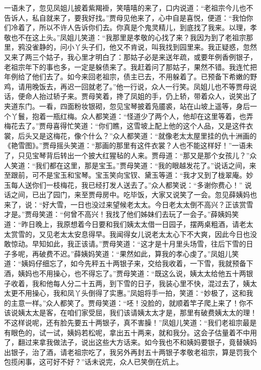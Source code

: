 \documentclass[12pt,oneside]{book}
\begin{document}
一语未了，忽见凤姐儿披着紫羯褂，笑嘻嘻的来了，口内说道：“老祖宗今儿也不告诉人，私自就来了，要我好找。”贾母见他来了，心中自是喜悦，便道：“我怕你们冷着了，所以不许人告诉你们去。你真是个鬼灵精儿，到底找了我来。以理，孝敬也不在这上头。”凤姐儿笑道：“我那里是孝敬的心找了来？我因为到了老祖宗那里，鸦没雀静的，问小丫头子们，他又不肯说，叫我找到园里来。我正疑惑，忽然又来了两三个姑子，我心里才明白了：那姑子必是来送年疏，或要年例香例银子，老祖宗年下的事也多，一定是躲债来了。我赶着问了那姑子，果然不错。我连忙把年例给了他们去了。如今来回老祖宗，债主已去，不用躲着了。已预备下希嫩的野鸡，请用晚饭去，再迟一回就老了。”他一行说，众人一行笑。凤姐儿也不等贾母说话，便命人抬过轿子来。贾母笑着，搀了凤姐的手，仍上轿，带着众人，说笑出了夹道东门。一看，四面粉妆银砌，忽见宝琴披着凫靥裘，站在山坡上遥等，身后一个丫鬟，抱着一瓶红梅。众人都笑道：“怪道少了两个人，他却在这里等着，也弄梅花去了。”贾母喜得忙笑道：“你们瞧，这雪坡上配上他的这个人品，又是这件衣裳，后头又是这梅花，像个什么？”众人都笑道：“就像老太太屋里挂的仇十洲画的《艳雪图》。”贾母摇头笑道：“那画的那里有这件衣裳？人也不能这样好！”一语未了，只见宝琴背后转出一个披大红猩毡的人来。贾母道：“那又是那个女孩儿？”众人笑道：“我们都在这里，那是宝玉。”贾母笑道：“我的眼越发花了。”说话之间，来至跟前，可不是宝玉和宝琴。宝玉笑向宝钗、黛玉等道：“我才又到了栊翠庵。妙玉每人送你们一枝梅花，我已经打发人送去了。”众人都笑说：“多谢你费心！”
说话之间，已出了园门，来至贾母房中。吃毕饭，大家又说笑了一会。忽见薛姨妈也来了，说：“好大雪，一日也没过来望候老太太。今日老太太倒不高兴？正该赏雪才是。”贾母笑道：“何曾不高兴！我找了他们姊妹们去玩了一会子。”薛姨妈笑道：“昨日晚上，我原想着今日要和我们姨太太借一日园子，摆两桌粗酒，请老太太赏雪的，又见老太太安息得早。我闻得女儿说老太太心下不大爽，因此今日也没敢惊动。早知如此，我正该请。”贾母笑道：“这才是十月里头场雪，往后下雪的日子多呢，再破费不迟。”薛姨妈笑道：“果然如此，算我的孝心虔了。”凤姐儿笑道：“姨妈仔细忘了，如今先秤五十两银子来，交给我收着，一下雪，我就预备下酒，姨妈也不用操心，也不得忘了。”贾母笑道：“既这么说，姨太太给他五十两银子收着，我和他每人分二十五两，到下雪的日子，我装心里不快，混过去了，姨太太更不用操心，我和凤丫头倒得了实惠。”凤姐将手一拍，笑道：“妙极了，这和我的主意一样。”众人都笑了。贾母笑道：“呸！没脸的，就顺着竿子爬上来了！你不该说姨太太是客，在咱们家受屈，我们该请姨太太才是，那里有破费姨太太的理！不这样说呢，还有脸先要五十两银子，真不害臊！”凤姐儿笑道：“我们老祖宗最是有眼色的，试一试，姨妈若松呢，拿出五十两来，就和我分。这会子估量着不中用了，翻过来拿我做法子，说出这些大方话来。如今我也不和姨妈要银子，竟替姨妈出银子，治了酒，请老祖宗吃了，我另外再封五十两银子孝敬老祖宗，算是罚我个包揽闲事，这可好不好？”话未说完，众人已笑倒在炕上。
\end{document}
